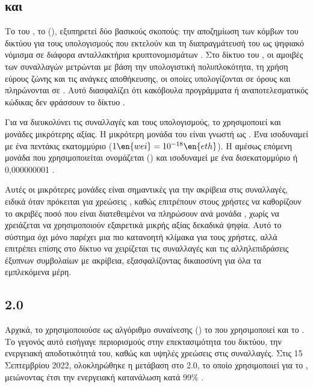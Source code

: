 \subsection{ και }
Το  του , το  (), εξυπηρετεί δύο βασικούς σκοπούς: την αποζημίωση των κόμβων του δικτύου για τους υπολογισμούς που εκτελούν και τη διαπραγμάτευσή του ως ψηφιακό νόμισμα σε διάφορα ανταλλακτήρια κρυπτονομισμάτων \cite{ref20}. Στο δίκτυο του , οι αμοιβές των συναλλαγών μετρώνται με βάση την υπολογιστική πολυπλοκότητα, τη χρήση εύρους ζώνης και τις ανάγκες αποθήκευσης, οι οποίες υπολογίζονται σε όρους  και πληρώνονται σε . Αυτό διασφαλίζει ότι κακόβουλα προγράμματα ή αναποτελεσματικός κώδικας δεν φράσσουν το δίκτυο \cite{ref21}.

Για να διευκολύνει τις συναλλαγές και τους υπολογισμούς, το  χρησιμοποιεί και μονάδες μικρότερης αξίας. Η μικρότερη μονάδα του  είναι γνωστή ως . Ένα  ισοδυναμεί με ένα πεντάκις εκατομμύριο  ($1 \en{wei} = 10^{-18} \en{eth}$). H αμέσως επόμενη μονάδα που χρησιμοποιείται ονομάζεται  () και ισοδυναμεί με ένα δισεκατομμύριο  ή 0,000000001 .

Αυτές οι μικρότερες μονάδες  είναι σημαντικές για την ακρίβεια στις συναλλαγές, ειδικά όταν πρόκειται για χρεώσεις , καθώς επιτρέπουν στους χρήστες να καθορίζουν το ακριβές ποσό που είναι διατεθειμένοι να πληρώσουν ανά μονάδα , χωρίς να χρειάζεται να χρησιμοποιούν εξαιρετικά μικρής αξίας δεκαδικά ψηφία. Αυτό το σύστημα όχι μόνο παρέχει μια πιο κατανοητή κλίμακα για τους χρήστες, αλλά επιτρέπει επίσης στο δίκτυο  να χειρίζεται τις συναλλαγές και τις αλληλεπιδράσεις έξυπνων συμβολαίων με ακρίβεια, εξασφαλίζοντας δικαιοσύνη για όλα τα εμπλεκόμενα μέρη.

\subsection{ 2.0}
Αρχικά, το  χρησιμοποιούσε ως αλγόριθμο συναίνεσης () το  που χρησιμοποιεί και το . Το γεγονός αυτό εισήγαγε περιορισμούς στην επεκτασιμότητα του δικτύου, την ενεργειακή αποδοτικότητά του, καθώς και υψηλές χρεώσεις στις συναλλαγές. Στις 15 Σεπτεμβρίου 2022, ολοκληρώθηκε η μετάβαση στο  2.0, το οποίο χρησιμοποιεί για  το , μειώνοντας έτσι την ενεργειακή κατανάλωση κατά 99\% \cite{ref22}. 

